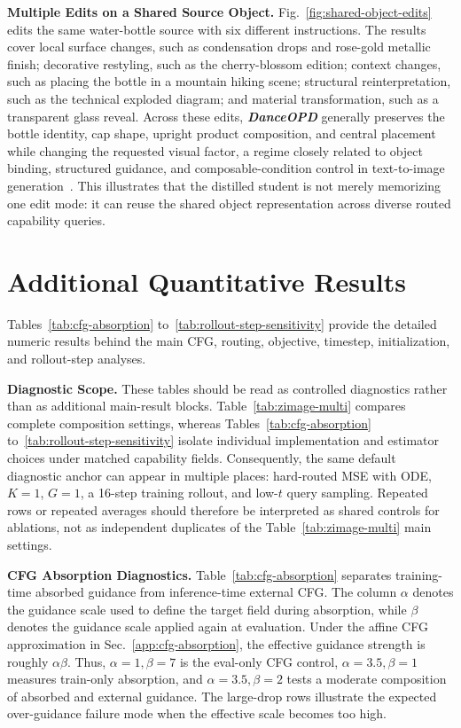 \documentclass{llmxive}
\providecommand{\name}{\textsl{\textbf{DanceOPD}}\xspace}
\begin{document}
\noindent\textbf{Multiple Edits on a Shared Source Object.}
Fig.~\ref{fig:shared-object-edits} edits the same water-bottle source with six different instructions. The results cover local surface changes, such as condensation drops and rose-gold metallic finish; decorative restyling, such as the cherry-blossom edition; context changes, such as placing the bottle in a mountain hiking scene; structural reinterpretation, such as the technical exploded diagram; and material transformation, such as a transparent glass reveal. Across these edits, \name{} generally preserves the bottle identity, cap shape, upright product composition, and central placement while changing the requested visual factor, a regime closely related to object binding, structured guidance, and composable-condition control in text-to-image generation~\cite{chefer2023attend,feng2022training,huang2023composer}. This illustrates that the distilled student is not merely memorizing one edit mode: it can reuse the shared object representation across diverse routed capability queries.


\vspace{0.2cm}


\section{Additional Quantitative Results}
\label{app:detailed-results}

Tables~\ref{tab:cfg-absorption} to~\ref{tab:rollout-step-sensitivity} provide the detailed numeric results behind the main CFG, routing, objective, timestep, initialization, and rollout-step analyses.

\noindent\textbf{Diagnostic Scope.}
These tables should be read as controlled diagnostics rather than as additional main-result blocks. Table~\ref{tab:zimage-multi} compares complete composition settings, whereas Tables~\ref{tab:cfg-absorption} to~\ref{tab:rollout-step-sensitivity} isolate individual implementation and estimator choices under matched capability fields. Consequently, the same default diagnostic anchor can appear in multiple places: hard-routed MSE with ODE, $K{=}1$, $G{=}1$, a 16-step training rollout, and low-$t$ query sampling. Repeated rows or repeated averages should therefore be interpreted as shared controls for ablations, not as independent duplicates of the Table~\ref{tab:zimage-multi} main settings.


\noindent\textbf{CFG Absorption Diagnostics.}
Table~\ref{tab:cfg-absorption} separates training-time absorbed guidance from inference-time external CFG. The column $\alpha$ denotes the guidance scale used to define the target field during absorption, while $\beta$ denotes the guidance scale applied again at evaluation. Under the affine CFG approximation in Sec.~\ref{app:cfg-absorption}, the effective guidance strength is roughly $\alpha\beta$. Thus, $\alpha{=}1,\beta{=}7$ is the eval-only CFG control, $\alpha{=}3.5,\beta{=}1$ measures train-only absorption, and $\alpha{=}3.5,\beta{=}2$ tests a moderate composition of absorbed and external guidance. The large-drop rows illustrate the expected over-guidance failure mode when the effective scale becomes too high.
\end{document}

